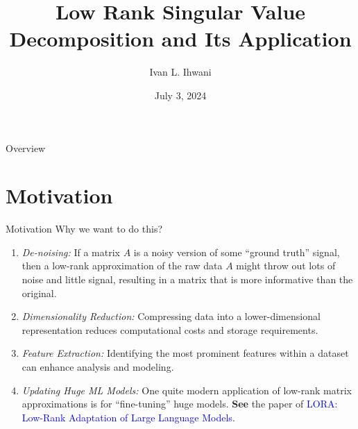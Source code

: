 \documentclass[aspectratio=169,xcolor=dvipsnames]{beamer}
\title[SVD \& Its Appl.]{Low Rank Singular Value Decomposition and Its Application} %
\author[Ivan L. Ihwani]{Ivan L. Ihwani}
\institute[M115 2024]{Department of Mathematics \newline National Central University}
\date{July 3, 2024} %
\begin{document}
\begin{frame}[plain]
    \titlepage
\end{frame}

\begin{frame}{Overview}
    \tableofcontents
\end{frame}

\section{Motivation}
\begin{frame}{Motivation}
Why we want to do this?
\begin{enumerate}
\item \textit{De-noising:} If a matrix $A$ is a noisy version of some \enquote{ground truth} signal, then a low-rank approximation of the raw data $A$ might throw out lots of noise and little signal, resulting in a matrix that is more informative than the original.
\item \textit{Dimensionality Reduction:} Compressing data into a lower-dimensional representation reduces computational costs and storage requirements.
\item \textit{Feature Extraction:} Identifying the most prominent features within a dataset can enhance analysis and modeling.
\item \textit{Updating Huge ML Models:} One quite modern application of low-rank matrix approximations is for \enquote{fine-tuning} huge models. \textbf{See} the paper of \textcolor{blue}{LORA: Low-Rank Adaptation of Large Language Models}.
\end{enumerate}
\end{frame}
\end{document}
